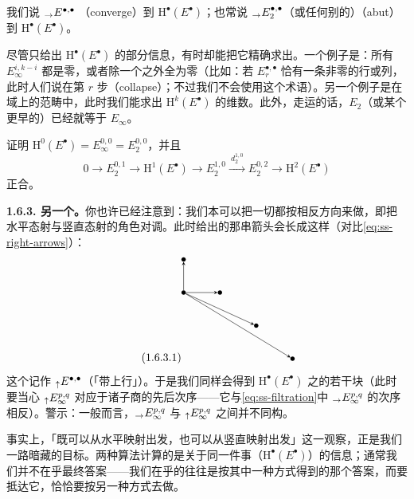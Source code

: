 我们说\trSpectralSequence{} ${}_{\to}E^{\bullet,\bullet}_{}$ \textbf{\trConverge}（converge）到 $\mathrm{H}^{\bullet}(E^{\bullet})$；也常说 ${}_{\to}E^{\bullet,\bullet}_{2}$（或任何别的\trPage）\textbf{\trAbut}（abut）到 $\mathrm{H}^{\bullet}(E^{\bullet})$。

尽管\trFiltered{}只给出 $\mathrm{H}^{\bullet}(E^{\bullet})$ 的部分信息，有时却能把它精确求出。一个例子是：所有 $E^{i,k-i}_{\infty}$ 都是零，或者除一个之外全为零（比如：若 $E^{\bullet,\bullet}_{r}$ 恰有一条非零的行或列，此时人们说\trSpectralSequence{}在第 $r$ 步\textbf{\trCollapse}（collapse）；不过我们不会使用这个术语）。另一个例子是在域上\trVectorSpace{}的范畴中，此时我们能求出 $\mathrm{H}^{k}(E^{\bullet})$ 的维数。此外，走运的话，$E_{2}$（或某个更早的\trPage）已经就等于 $E_{\infty}$。

\begin{exercise}\label{ex:ss-low-degree-info}
证明 $\mathrm{H}^{0}(E^{\bullet})=E^{0,0}_{\infty}=E^{0,0}_{2}$，并且
\[
0\longrightarrow E^{0,1}_{2}\longrightarrow\mathrm{H}^{1}(E^{\bullet})
\longrightarrow E^{1,0}_{2}\mathrel{\xrightarrow{\ d^{1,0}_{2}\ }}E^{0,2}_{2}
\longrightarrow\mathrm{H}^{2}(E^{\bullet})
\]
正合。
\end{exercise}


\textbf{1.6.3. 另一个\trOrientation。}\quad 你也许已经注意到：我们本可以把一切都按相反方向来做，即把水平态射与竖直态射的角色对调。此时给出\trSpectralSequence{}的那串箭头会长成这样（对比\eqref{eq:ss-right-arrows}）：
\begin{equation*}\tag{1.6.3.1}\label{eq:ss-up-arrows}
\begin{tikzpicture}[>=stealth,dot/.style={circle,fill,inner sep=1.4pt}]
  \node[dot] (o)  at (0,0)        {};
  \node[dot] (u0) at (0,1.05)     {};
  \node[dot] (r0) at (1.15,0)     {};
  \node[dot] (r1) at (2.3,-1.05)  {};
  \node[dot] (r2) at (3.45,-2.1)  {};
  \draw[->] (o) -- (u0);
  \draw[->] (o) -- (r0);
  \draw[->] (o) -- (r1);
  \draw[->] (o) -- (r2);
\end{tikzpicture}
\end{equation*}
这个\trSpectralSequence{}记作 ${}_{\uparrow}E^{\bullet,\bullet}_{}$（「带上行\trOrientation」）。于是我们同样会得到 $\mathrm{H}^{\bullet}(E^{\bullet})$ 之\trFiltered{}的若干块（此时要当心 ${}_{\uparrow}E^{p,q}_{\infty}$ 对应于诸子商的先后次序——它与\eqref{eq:ss-filtration}中 ${}_{\to}E^{p,q}_{\infty}$ 的次序相反）。警示：一般而言，${}_{\to}E^{p,q}_{\infty}$ 与 ${}_{\uparrow}E^{p,q}_{\infty}$ 之间并不同构。

事实上，「既可以从水平映射出发，也可以从竖直映射出发」这一观察，正是我们一路暗藏的目标。两种算法计算的是关于同一件事（$\mathrm{H}^{\bullet}(E^{\bullet})$）的信息；通常我们并不在乎最终答案——我们在乎的往往是按其中一种方式得到的那个答案，而要抵达它，恰恰要按另一种方式去做\trSpectralSequence。

